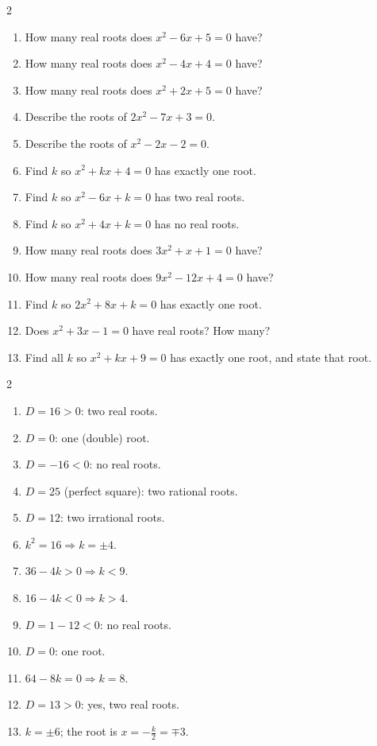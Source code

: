 \documentclass[11pt]{article}
\begin{document}
\begin{recapbox}
\begin{multicols}{2}
\small
\begin{enumerate}[leftmargin=*,itemsep=3pt]
  \item How many real roots does $x^2-6x+5=0$ have?
  \item How many real roots does $x^2-4x+4=0$ have?
  \item How many real roots does $x^2+2x+5=0$ have?
  \item Describe the roots of $2x^2-7x+3=0$.
  \item Describe the roots of $x^2-2x-2=0$.
  \item Find $k$ so $x^2+kx+4=0$ has exactly one root.
  \item Find $k$ so $x^2-6x+k=0$ has two real roots.
  \item Find $k$ so $x^2+4x+k=0$ has no real roots.
  \item How many real roots does $3x^2+x+1=0$ have?
  \item How many real roots does $9x^2-12x+4=0$ have?
  \item Find $k$ so $2x^2+8x+k=0$ has exactly one root.
  \item Does $x^2+3x-1=0$ have real roots? How many?
  \item Find all $k$ so $x^2+kx+9=0$ has exactly one root, and state that root.
\end{enumerate}
\end{multicols}
\end{recapbox}

\begin{keybox}
\begin{multicols}{2}
\small
\begin{enumerate}[leftmargin=*,itemsep=3pt]
  \item $D=16>0$: two real roots.
  \item $D=0$: one (double) root.
  \item $D=-16<0$: no real roots.
  \item $D=25$ (perfect square): two rational roots.
  \item $D=12$: two irrational roots.
  \item $k^2=16\Rightarrow k=\pm4$.
  \item $36-4k>0\Rightarrow k<9$.
  \item $16-4k<0\Rightarrow k>4$.
  \item $D=1-12<0$: no real roots.
  \item $D=0$: one root.
  \item $64-8k=0\Rightarrow k=8$.
  \item $D=13>0$: yes, two real roots.
  \item $k=\pm6$; the root is $x=-\tfrac{k}{2}=\mp3$.
\end{enumerate}
\end{multicols}
\end{keybox}
\end{document}
